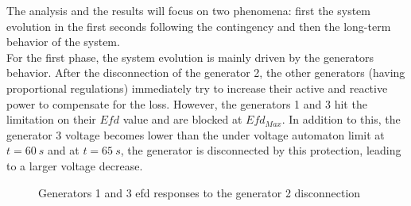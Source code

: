 \documentclass[a4paper, 12pt]{report}
\begin{document}
The analysis and the results will focus on two phenomena: first the system evolution in the first seconds following the contingency and then the long-term behavior of the system. \\

For the first phase, the system evolution is mainly driven by the generators behavior. After the disconnection of the generator 2, the other generators (having proportional regulations) immediately try to increase their active and reactive power to compensate for the loss. However, the generators 1 and 3 hit the limitation on their $Efd$ value and are blocked at $Efd_{Max}$. In addition to this, the generator 3 voltage becomes lower than the under voltage automaton limit at $t = 60 \ s$ and at $t = 65 \ s$, the generator is disconnected by this protection, leading to a larger voltage decrease.

\begin{figure}[H]
\caption{Generators 1 and 3 efd responses to the generator 2 disconnection}
\end{figure}
\end{document}
